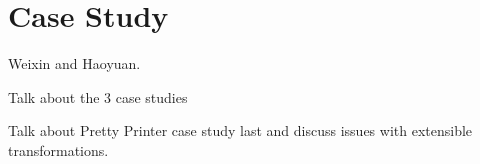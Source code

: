 \section{Case Study}

Weixin and Haoyuan.

Talk about the 3 case studies

Talk about Pretty Printer case study last and discuss issues with 
extensible transformations.
